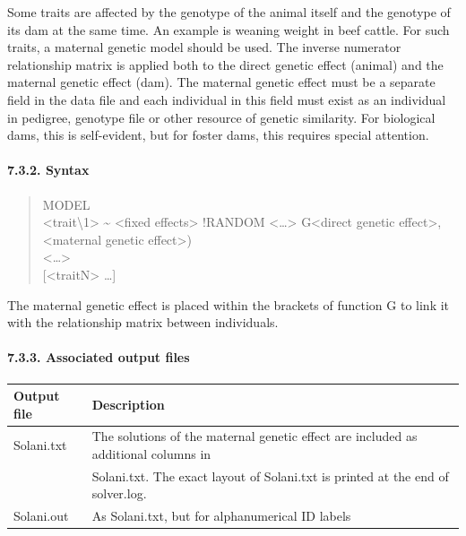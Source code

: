 Some traits are affected by the genotype of the animal itself and the
genotype of its dam at the same time. An example is weaning weight in
beef cattle. For such traits, a maternal genetic model should be used.
The inverse numerator relationship matrix is applied both to the direct
genetic effect (animal) and the maternal genetic effect (dam). The
maternal genetic effect must be a separate field in the data file and
each individual in this field must exist as an individual in pedigree,
genotype file or other resource of genetic similarity. For biological
dams, this is self-evident, but for foster dams, this requires special
attention.

\paragraph{7.3.2. Syntax}\label{Stat12}

\begin{quote}
MODEL\\
\textless trait\textbackslash1\textgreater{} \textasciitilde{}
\textless fixed effects\textgreater{} !RANDOM
\textless\ldots\textgreater{} G\textless direct genetic
effect\textgreater, \textless maternal genetic effect\textgreater)\\
\textless\ldots\textgreater{}\\
{[}\textless traitN\textgreater{} \ldots{]}
\end{quote}

The maternal genetic effect is placed within the brackets of function G
to link it with the relationship matrix between individuals.

\paragraph{7.3.3. Associated output files}\label{Stat13}

{\def\LTcaptype{none} %
\begin{longtable}[]{@{}
  >{\raggedright\arraybackslash}p{}
  >{\raggedright\arraybackslash}p{}@{}}
\toprule\noalign{}
\begin{minipage}[b]{\linewidth}\raggedright
Output file
\end{minipage} & \begin{minipage}[b]{\linewidth}\raggedright
Description
\end{minipage} \\
\midrule\noalign{}
\endhead
\bottomrule\noalign{}
\endlastfoot
Solani.txt & The solutions of the maternal genetic effect are included
as additional columns in \\
& Solani.txt. The exact layout of Solani.txt is printed at the end of
solver.log. \\
Solani.out & As Solani.txt, but for alphanumerical ID labels \\
\end{longtable}
}

